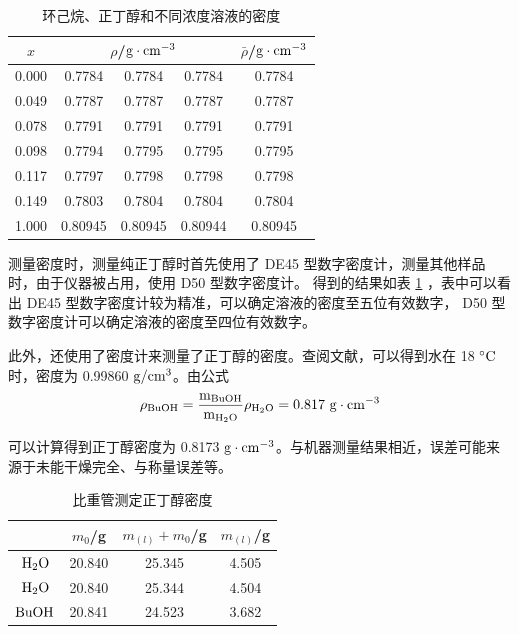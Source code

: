 \documentclass[cn,hazy,pku,12pt,normal,math=newtx,cite=super]{elegantnote}
\begin{document}
\begin{table}[h]
    \centering
    \caption{环己烷、正丁醇和不同浓度溶液的密度}
    \label{04}
    \begin{tabular}{ccccc}
    \hline
    $x$ & \multicolumn{3}{c}{$\rho$/$\rm g\cdot   cm^{-3}$} & \multicolumn{1}{c}{$\bar{\rho}$/$\rm g\cdot cm^{-3}$} \\ \hline
    0.000 & 0.7784  & 0.7784  & 0.7784  & 0.7784  \\
    0.049 & 0.7787  & 0.7787  & 0.7787  & 0.7787  \\
    0.078 & 0.7791  & 0.7791  & 0.7791  & 0.7791  \\
    0.098 & 0.7794  & 0.7795  & 0.7795  & 0.7795  \\
    0.117 & 0.7797  & 0.7798  & 0.7798  & 0.7798  \\
    0.149 & 0.7803  & 0.7804  & 0.7804  & 0.7804  \\
    1.000 & 0.80945 & 0.80945 & 0.80944 & 0.80945 \\ \hline
    \end{tabular}
\end{table}

测量密度时，测量纯正丁醇时首先使用了 DE45 型数字密度计，测量其他样品时，由于仪器被占用，使用 D50 型数字密度计。
得到的结果如表 \ref{04} ，表中可以看出 DE45 型数字密度计较为精准，可以确定溶液的密度至五位有效数字，
D50 型数字密度计可以确定溶液的密度至四位有效数字。

此外，还使用了密度计来测量了正丁醇的密度。查阅文献\cite{CRC}，可以得到水在 18 $\rm \degree C$ 时，密度为 0.99860 $\rm g/cm^3$。由公式
\begin{equation}
\rm    \rho_{BuOH} = \frac{m_{BuOH}}{m_{H_2O}} \rho_{H_2O} = 0.817 \ g\cdot   cm^{-3}
\end{equation}

可以计算得到正丁醇密度为 0.8173 $\rm g\cdot   cm^{-3}$。与机器测量结果相近，误差可能来源于未能干燥完全、与称量误差等。

\begin{table}[h]
    \centering
    \caption{比重管测定正丁醇密度}
    \label{05}
    \begin{tabular}{cccc}
    \hline
               & $m_0$/g  & $m_{(l)}+m_0$/g  & $m_{(l)}$/g  \\\hline
    $\rm H_2O$ & 20.840  & 25.345        & 4.505     \\
    $\rm H_2O$ & 20.840  & 25.344        & 4.504     \\
    $\rm BuOH$ & 20.841 & 24.523        & 3.682    \\ \hline
    \end{tabular}
\end{table}
\end{document}
